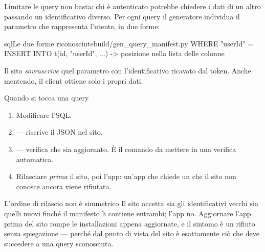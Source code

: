 Limitare le query non basta: chi è autenticato potrebbe chiedere i dati di un
altro passando un identificativo diverso. Per ogni query il generatore
individua il parametro che rappresenta l'utente, in due forme:

\begin{codiceInterno}{sql}{Le due forme riconosciute}{build/gen\_query\_manifest.py}
    WHERE "userId" = %
    INSERT INTO t(id, "userId", ...) -> posizione nella lista delle colonne
\end{codiceInterno}

\noindent
Il sito \emph{sovrascrive} quel parametro con l'identificativo ricavato dal
token. Anche mentendo, il client ottiene solo i propri dati.

\begin{pratica}{Quando si tocca una query}
\begin{enumerate}
  \item Modificare l'SQL.
  \item {} --- riscrive il JSON nel
        sito.
  \item {} --- verifica che
        sia aggiornato. È il comando da mettere in una verifica automatica.
  \item Rilasciare \emph{prima} il sito, poi l'app: un'app che chiede un
         che il sito non conosce ancora viene rifiutata.
\end{enumerate}
\end{pratica}

\begin{attenzione}{L'ordine di rilascio non è simmetrico}
Il sito accetta sia gli identificativi vecchi sia quelli nuovi finché il
manifesto li contiene entrambi; l'app no. Aggiornare l'app prima del sito
rompe le installazioni appena aggiornate, e il sintomo è un rifiuto senza
spiegazione --- perché dal punto di vista del sito è esattamente ciò che
deve succedere a una query sconosciuta.
\end{attenzione}
